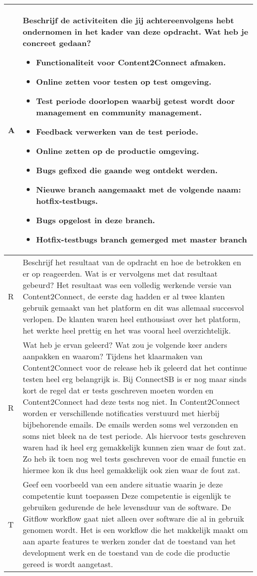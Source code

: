 \begin{tabularx}{\textwidth}{| l | X |}
\\
\hline
A & Beschrijf de activiteiten die jij achtereenvolgens hebt ondernomen in het kader van deze opdracht. Wat heb je concreet gedaan?
\begin{itemize}
\item Functionaliteit voor Content2Connect afmaken.
\item Online zetten voor testen op test omgeving.
\item Test periode doorlopen waarbij getest wordt door management en community management.
\item Feedback verwerken van de test periode.
\item Online zetten op de productie omgeving.
\item Bugs gefixed die gaande weg ontdekt werden.
\item Nieuwe branch aangemaakt met de volgende naam: hotfix-testbugs.
\item Bugs opgelost in deze branch.
\item Hotfix-testbugs branch gemerged met master branch
\end{itemize}
\\
\hline
R & Beschrijf het resultaat van de opdracht en hoe de betrokken en er op reageerden. Wat is er vervolgens met dat resultaat gebeurd?
\newline
Het resultaat was een volledig werkende versie van  Content2Connect, de eerste dag hadden er al twee klanten gebruik gemaakt van het platform en dit was allemaal succesvol verlopen. De klanten waren heel enthousiast over het platform, het werkte heel prettig en het was vooral heel overzichtelijk. 
\\
\hline
R & Wat heb je ervan geleerd? Wat zou je volgende keer anders aanpakken en waarom?
\newline
Tijdens het klaarmaken van Content2Connect voor de release heb ik geleerd dat het continue testen heel erg belangrijk is. Bij ConnectSB is er nog maar sinds kort de regel dat er tests geschreven moeten worden en Content2Connect had deze tests nog niet. In Content2Connect worden er verschillende notificaties verstuurd met hierbij bijbehorende emails. De emails werden soms wel verzonden en soms niet bleek na de test periode. Als hiervoor tests geschreven waren had ik heel erg gemakkelijk kunnen zien waar de fout zat. Zo heb ik toen nog wel tests geschreven voor de email functie en hiermee kon ik dus heel gemakkelijk ook zien waar de fout zat.
\\
\hline
T & Geef een voorbeeld van een andere situatie waarin je deze competentie kunt toepassen
\newline
Deze competentie is eigenlijk te gebruiken gedurende de hele levensduur van de software. De Gitflow workflow gaat niet alleen over software die al in gebruik genomen wordt. Het is een workflow die het makkelijk maakt om aan aparte features te werken zonder dat de toestand van het development werk en de toestand van de code die productie gereed is wordt aangetast.
\\
\hline
\end{tabularx}